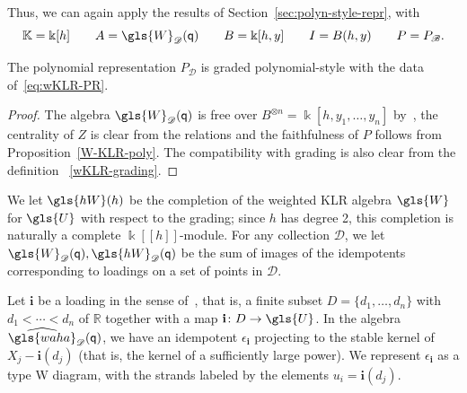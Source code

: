 \documentclass[ALCO,ThmDefs,Unicode,epreuves]{cedram}
\newcommand{\Bi}{\mathbf{i}}
\newcommand{\pq}{\mathsf{q}}
\newcommand{\K}{\Bbbk}%
\newcommand{\R}{\mathbb{R}}
\newcommand{\waha}{\gls{waha}}
\newcommand\llbracket{[\![}
\newcommand\rrbracket{]\!]}
\begin{document}
Thus, we can again apply the results of Section~\ref{sec:polyn-style-repr},
with 
\begin{equation}
\mathbb{K}=\K[h]\qquad A=\gls{W}_{\mathscr{D}}(\pq) \qquad
 B=\K[h,y]\qquad I=B(h,y)\qquad P=P_{\mathscr{B}}.\label{eq:wKLR-PR}
\end{equation}

\begin{lemma}
 The polynomial representation $P_{\mathscr{D}}$ is graded polynomial-style
 with the data of~\eqref{eq:wKLR-PR}. 
\end{lemma}
\begin{proof}
 The algebra $\gls{W}_{\mathscr{D}}(\pq) $ is free over $B^{\otimes
 n}=\K[h,y_1,\dots, y_n]$ by~\cite[Thm.~2.8]{WebwKLR}, the
 centrality of $Z$ is clear from the relations and the faithfulness
 of $P$ follows from Proposition~\ref{W-KLR-poly}. The compatibility
 with grading is also clear from the definition
~\eqref{wKLR-grading}. 
\end{proof}

\begin{defi}\label{def:hW}
We let $\gls{hW}(h)$ be the completion of the weighted KLR algebra
$\gls{W}$ for $\gls{U}$
with respect to the grading; since $h$ has degree 2, this completion
is naturally a complete $\K\llbracket h\rrbracket $-module. For any collection $\mathscr{D}$, we let
$\gls{W}_{\mathscr{D}}(\pq),\gls{hW}_{\mathscr{D}}(\pq)$ be the sum of images of
the idempotents corresponding to loadings on a set of points in $\mathscr{D}$.
\end{defi} 

Let $\Bi$ be a loading in
the sense of~\cite{WebwKLR}, that is, a finite subset $D=\{d_1,\dots, d_n\}$ with
$d_1<\cdots <d_n$ of $\R$
together with a map $\Bi\colon D\to \gls{U}$.
In the algebra $\widehat{\waha}_{\mathscr{D}}(\pq)$, we have an idempotent
$\epsilon_{\Bi}$ projecting to the stable kernel of $X_j-\Bi(d_j)$
(that is, the kernel of a sufficiently large power). 
We represent $\epsilon_{\Bi}$ as a type W
diagram, with the strands labeled by the elements
$u_i=\Bi(d_j)$. 
\end{document}

